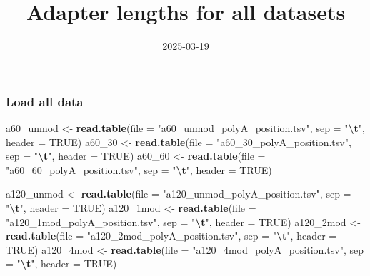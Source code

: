 \documentclass[
]{article}
\title{Adapter lengths for all datasets}
\author{}
\date{\vspace{-2.5em}2025-03-19}
\newenvironment{Shaded}{\begin{snugshade}}{\end{snugshade}}
\newcommand{\AttributeTok}[1]{\textcolor[rgb]{0.13,0.29,0.53}{#1}}
\newcommand{\ConstantTok}[1]{\textcolor[rgb]{0.56,0.35,0.01}{#1}}
\newcommand{\FunctionTok}[1]{\textcolor[rgb]{0.13,0.29,0.53}{\textbf{#1}}}
\newcommand{\NormalTok}[1]{#1}
\newcommand{\OtherTok}[1]{\textcolor[rgb]{0.56,0.35,0.01}{#1}}
\newcommand{\SpecialCharTok}[1]{\textcolor[rgb]{0.81,0.36,0.00}{\textbf{#1}}}
\newcommand{\StringTok}[1]{\textcolor[rgb]{0.31,0.60,0.02}{#1}}
\begin{document}
\maketitle

\subsubsection{Load all data}\label{load-all-data}

\begin{Shaded}
\begin{Highlighting}[]
\NormalTok{a60\_unmod }\OtherTok{\textless{}{-}} \FunctionTok{read.table}\NormalTok{(}\AttributeTok{file =} \StringTok{"a60\_unmod\_polyA\_position.tsv"}\NormalTok{, }\AttributeTok{sep =} \StringTok{"}\SpecialCharTok{\textbackslash{}t}\StringTok{"}\NormalTok{, }\AttributeTok{header =} \ConstantTok{TRUE}\NormalTok{)}
\NormalTok{a60\_30 }\OtherTok{\textless{}{-}} \FunctionTok{read.table}\NormalTok{(}\AttributeTok{file =} \StringTok{"a60\_30\_polyA\_position.tsv"}\NormalTok{, }\AttributeTok{sep =} \StringTok{"}\SpecialCharTok{\textbackslash{}t}\StringTok{"}\NormalTok{, }\AttributeTok{header =} \ConstantTok{TRUE}\NormalTok{)}
\NormalTok{a60\_60 }\OtherTok{\textless{}{-}} \FunctionTok{read.table}\NormalTok{(}\AttributeTok{file =} \StringTok{"a60\_60\_polyA\_position.tsv"}\NormalTok{, }\AttributeTok{sep =} \StringTok{"}\SpecialCharTok{\textbackslash{}t}\StringTok{"}\NormalTok{, }\AttributeTok{header =} \ConstantTok{TRUE}\NormalTok{)}

\NormalTok{a120\_unmod }\OtherTok{\textless{}{-}} \FunctionTok{read.table}\NormalTok{(}\AttributeTok{file =} \StringTok{"a120\_unmod\_polyA\_position.tsv"}\NormalTok{, }\AttributeTok{sep =} \StringTok{"}\SpecialCharTok{\textbackslash{}t}\StringTok{"}\NormalTok{, }\AttributeTok{header =} \ConstantTok{TRUE}\NormalTok{)}
\NormalTok{a120\_1mod }\OtherTok{\textless{}{-}} \FunctionTok{read.table}\NormalTok{(}\AttributeTok{file =} \StringTok{"a120\_1mod\_polyA\_position.tsv"}\NormalTok{, }\AttributeTok{sep =} \StringTok{"}\SpecialCharTok{\textbackslash{}t}\StringTok{"}\NormalTok{, }\AttributeTok{header =} \ConstantTok{TRUE}\NormalTok{)}
\NormalTok{a120\_2mod }\OtherTok{\textless{}{-}} \FunctionTok{read.table}\NormalTok{(}\AttributeTok{file =} \StringTok{"a120\_2mod\_polyA\_position.tsv"}\NormalTok{, }\AttributeTok{sep =} \StringTok{"}\SpecialCharTok{\textbackslash{}t}\StringTok{"}\NormalTok{, }\AttributeTok{header =} \ConstantTok{TRUE}\NormalTok{)}
\NormalTok{a120\_4mod }\OtherTok{\textless{}{-}} \FunctionTok{read.table}\NormalTok{(}\AttributeTok{file =} \StringTok{"a120\_4mod\_polyA\_position.tsv"}\NormalTok{, }\AttributeTok{sep =} \StringTok{"}\SpecialCharTok{\textbackslash{}t}\StringTok{"}\NormalTok{, }\AttributeTok{header =} \ConstantTok{TRUE}\NormalTok{)}
\end{Highlighting}
\end{Shaded}
\end{document}
